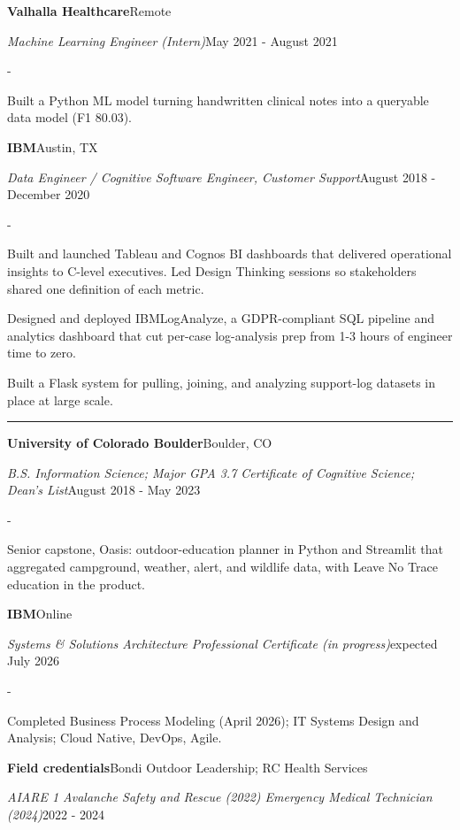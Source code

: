 \documentclass[10pt,letterpaper]{article}
\newenvironment{cvitems}{%
  \begin{list}{-}{%
    \setlength{\leftmargin}{12pt}%
    \setlength{\itemsep}{1.2pt}%
    \setlength{\parsep}{0pt}%
    \setlength{\topsep}{1.5pt}%
    \setlength{\partopsep}{0pt}%
    \setlength{\labelwidth}{6pt}%
    \setlength{\labelsep}{6pt}%
    \setlength{\itemindent}{0pt}%
  }%
}{\end{list}}
\newcommand{\cvsection}[1]{%
  \vspace{7pt}%
  \noindent{\bfseries\fontsize{11pt}{13pt}\selectfont\MakeUppercase{#1}}\par
  \vspace{1pt}%
  \noindent\rule{\textwidth}{0.4pt}\par
  \vspace{4pt}%
}
\newcommand{\cventryhead}[4]{%
  \noindent\textbf{#1}\hfill#2\par
  \vspace{0.5pt}%
  \noindent\textit{#3}\hfill#4\par
}
\newcommand{\cveduhead}[4]{%
  \noindent\textbf{#1}\hfill#2\par
  \vspace{0.5pt}%
  \noindent\textit{#3}\hfill#4\par
}
\begin{document}
\vspace{3pt}
\cventryhead{Valhalla Healthcare}{Remote}
{Machine Learning Engineer (Intern)}{May 2021 - August 2021}
\begin{cvitems}
  \item Built a Python ML model turning handwritten clinical notes into a queryable data model (F1 80.03).
\end{cvitems}

\vspace{3pt}
\cventryhead{IBM}{Austin, TX}
{Data Engineer / Cognitive Software Engineer, Customer Support}{August 2018 - December 2020}
\begin{cvitems}
  \item Built and launched Tableau and Cognos BI dashboards that delivered operational insights to C-level executives. Led Design Thinking sessions so stakeholders shared one definition of each metric.
  \item Designed and deployed IBMLogAnalyze, a GDPR-compliant SQL pipeline and analytics dashboard that cut per-case log-analysis prep from 1-3 hours of engineer time to zero.
  \item Built a Flask system for pulling, joining, and analyzing support-log datasets in place at large scale.
\end{cvitems}

\cvsection{Education}

\cveduhead{University of Colorado Boulder}{Boulder, CO}
{B.S. Information Science; Major GPA 3.7 \textbar{} Certificate of Cognitive Science; Dean's List}{August 2018 - May 2023}
\begin{cvitems}
  \item Senior capstone, Oasis: outdoor-education planner in Python and Streamlit that aggregated campground, weather, alert, and wildlife data, with Leave No Trace education in the product.
\end{cvitems}

\vspace{3pt}
\cveduhead{IBM}{Online}
{Systems \& Solutions Architecture Professional Certificate (in progress)}{expected July 2026}
\begin{cvitems}
  \item Completed Business Process Modeling (April 2026); IT Systems Design and Analysis; Cloud Native, DevOps, Agile.
\end{cvitems}

\vspace{3pt}
\cveduhead{Field credentials}{Bondi Outdoor Leadership; RC Health Services}
{AIARE 1 Avalanche Safety and Rescue (2022) \textbar{} Emergency Medical Technician (2024)}{2022 - 2024}
\end{document}
